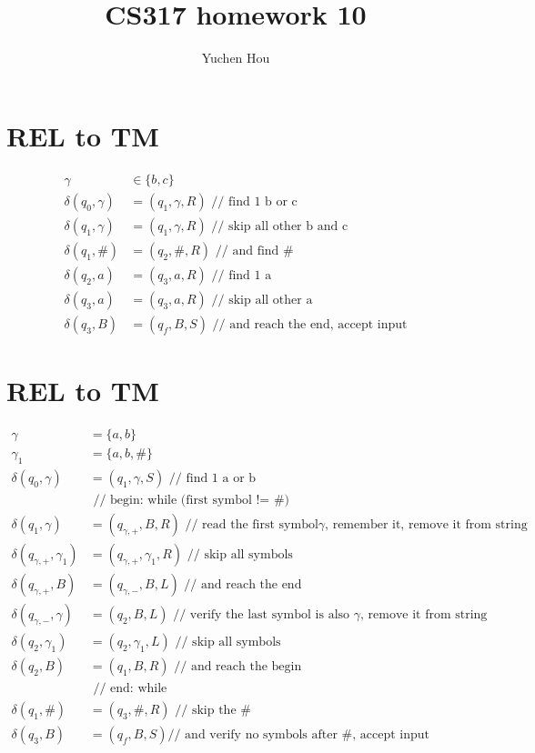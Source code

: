 \documentclass{article}
\begin{document}
\lstset{language=Java}
\title{CS317 homework 10}
\author{Yuchen Hou}
\maketitle

\section{REL to TM}
\begin{align*}
\gamma &\in \{b, c\}\\
\delta(q_0, \gamma) &= (q_1, \gamma, R) \text{ // find 1 b or c}\\
\delta(q_1, \gamma) &= (q_1, \gamma, R) \text{ // skip all other b and c}\\
\delta(q_1, \#) &= (q_2, \#, R) \text{ // and find \#}\\
\delta(q_2, a) &= (q_3, a, R) \text{ // find 1 a}\\
\delta(q_3, a) &= (q_3, a, R) \text{ // skip all other a}\\
\delta(q_3, B) &= (q_f, B, S) \text{ // and reach the end, accept input}
\end{align*}

\section{REL to TM}
\begin{align*}
\gamma &= \{a, b\}\\
\gamma_1 &= \{a, b, \#\}\\
\delta(q_0, \gamma) &= (q_1, \gamma, S) \text{ // find 1 a or b}\\
&\text{ // begin: while (first symbol != \#)}\\
\delta(q_1, \gamma) &= (q_{\gamma,+}, B, R) \text{ // read the first symbol
$\gamma$, remember it, remove it from string}\\
\delta(q_{\gamma,+}, \gamma_1) &= (q_{\gamma,+}, \gamma_1, R) \text{ // skip all
symbols}\\
\delta(q_{\gamma,+}, B) &= (q_{\gamma,-}, B, L) \text{ // and reach the end}\\
\delta(q_{\gamma,-}, \gamma) &= (q_2, B, L) \text{ // verify the last symbol is
also $\gamma$, remove it from string}\\
\delta(q_2, \gamma_1) &= (q_2, \gamma_1, L) \text{ // skip all symbols}\\
\delta(q_2, B) &= (q_1, B, R) \text{ // and reach the begin}\\
&\text{ // end: while}\\
\delta(q_1, \#) &= (q_3, \#, R) \text{ // skip the \#}\\
\delta(q_3, B) &= (q_f, B, S) \text{// and verify no symbols after \#, accept
input}
\end{align*}
\end{document}
